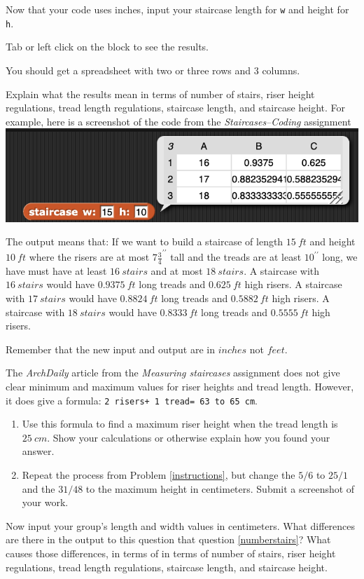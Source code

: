 \documentclass[handout,nooutcomes,noauthor,hints]{../ximera}
\begin{document}
\mynewpage

\begin{question}\label{numberstairs}
Now that your code uses inches, input your staircase length for \texttt{w} and height for \texttt{h}.

Tab or left click on the block to see the results.  

You should get a spreadsheet with two or three rows and 3 columns.

Explain what the results mean in terms of number of stairs, riser height regulations, tread length regulations, staircase length, and staircase height. For example, here is a screenshot of the code from the \emph{Staircases--Coding} assignment \includegraphics[height=1 in]{stairsfeet}

The output means that: If we want to build a staircase of length $15\ ft$ and height $10\ ft$ where the risers are at most $7\frac{3}{4}^{\prime\prime}$ tall and the treads are at least $10^{\prime\prime}$ long, we have must have at least $16\ stairs$ and at most $18\ stairs$. A staircase with $16\ stairs$ would have $0.9375\ ft$ long treads and $0.625\ ft$ high risers. A staircase with $17\ stairs$ would have $0.8824\ ft$ long treads and $0.5882\ ft$ high risers. 
A staircase with $18\ stairs$ would have $0.8333\ ft$ long treads and $0.5555\ ft$ high risers. 

Remember that the new input and output are in $inches$ not $feet$.

\end{question}
 
\mynewpage

\begin{question}
 The \emph{ArchDaily} article from the \emph{Measuring staircases} assignment does not give clear minimum and maximum values for riser heights and tread length. However, it does give a formula: \texttt{2 risers+ 1 tread= 63 to 65 cm}.

\begin{enumerate}
\item Use this formula to find a maximum riser height when the tread length is $25\ cm$. Show your calculations or otherwise explain how you found your answer.
\item Repeat the process from Problem \ref{instructions}, but change the $5/6$ to $25/1$ and the $31/48$ to the maximum height in centimeters. Submit a screenshot of your work.
\end{enumerate}
\end{question}

\begin{question}\label{cmstairs}
Now input your group's length and width values in centimeters. What differences are there in the output to this question that question \ref{numberstairs}? What causes those differences, in terms of in terms of number of stairs, riser height regulations, tread length regulations, staircase length, and staircase height. 
\end{question}
\end{document}
